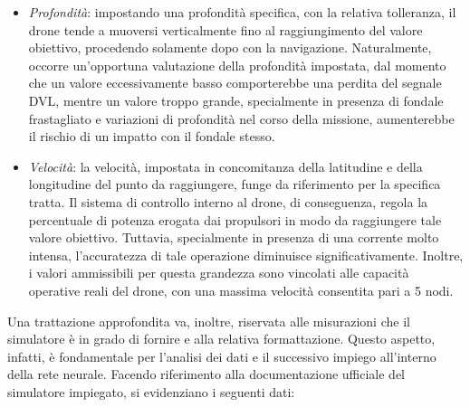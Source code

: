     \begin{itemize}

        \item \textit{Profondità}: impostando una profondità specifica, con la relativa tolleranza, il drone tende a muoversi verticalmente fino al raggiungimento del valore obiettivo, procedendo solamente dopo con la navigazione. Naturalmente, occorre un'opportuna valutazione della profondità impostata, dal momento che un valore eccessivamente basso comporterebbe una perdita del segnale DVL, mentre un valore troppo grande, specialmente in presenza di fondale frastagliato e variazioni di profondità nel corso della missione, aumenterebbe il rischio di un impatto con il fondale stesso.  
        
        \item \textit{Velocità}: la velocità, impostata in concomitanza della latitudine e della longitudine del punto da raggiungere, funge da riferimento per la specifica tratta. Il sistema di controllo interno al drone, di conseguenza, regola la percentuale di potenza erogata dai propulsori in modo da raggiungere tale valore obiettivo. Tuttavia, specialmente in presenza di una corrente molto intensa, l'accuratezza di tale operazione diminuisce significativamente. Inoltre, i valori ammissibili per questa grandezza sono vincolati alle capacità operative reali del drone, con una massima velocità consentita pari a 5 nodi.

    \end{itemize}

Una trattazione approfondita va, inoltre, riservata alle misurazioni che il simulatore è in grado di fornire e alla relativa formattazione. Questo aspetto, infatti, è fondamentale per l'analisi dei dati e il successivo impiego all'interno della rete neurale. Facendo riferimento alla documentazione ufficiale del simulatore impiegato, si evidenziano i seguenti dati: 

